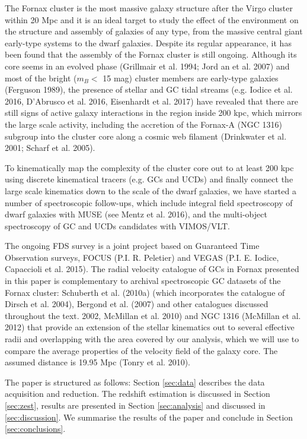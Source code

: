 The Fornax cluster is the most massive galaxy structure after the Virgo cluster 
within 20 Mpc and it is an ideal target to study the effect of the environment 
on the structure and assembly of galaxies of any type, from the massive central 
giant early-type systems to the dwarf galaxies. Despite its regular appearance, 
it has been found that the assembly of the Fornax cluster is still ongoing. 
Although its core seems in an evolved phase (Grillmair et al. 1994; Jord an et 
al. 2007) and most of the bright ($m_B < $  15 mag) cluster members are 
early-type galaxies (Ferguson 1989), the presence of stellar and GC tidal 
streams (e.g. Iodice et al. 2016, D’Abrusco et al. 2016, Eisenhardt et al. 
2017) have revealed that there are still signs of active galaxy interactions in 
the region inside 200 kpc, which mirrors the large scale activity, including 
the accretion of the Fornax-A (NGC 1316) subgroup into the cluster core along a 
cosmic web filament (Drinkwater et al. 2001; Scharf et al. 2005).

To kinematically map the complexity of the cluster core out to at least 200 kpc 
using discrete kinematical tracers (e.g. GCs and UCDs) and finally connect the 
large scale kinematics down to the scale of the dwarf galaxies, we have started 
a number of spectroscopic follow-ups, which include integral field spectroscopy 
of dwarf galaxies with MUSE (see Mentz et al. 2016), and the multi-object 
spectroscopy  of GC and UCDs candidates with VIMOS/VLT.

The ongoing FDS survey is a joint project based on Guaranteed Time Observation 
surveys, FOCUS (P.I. R. Peletier) and VEGAS (P.I. E. Iodice, Capaccioli et al. 
2015).
The radial velocity catalogue of GCs in Fornax presented in this paper is 
complementary to archival spectroscopic GC datasets of the Fornax cluster: 
Schuberth et al. (2010a) (which incorporates the catalogue of Dirsch et al. 
2004), Bergond et al. (2007) and other catalogues discussed throughout the 
text. 
2002, McMillan et al. 2010) and NGC 1316 (McMillan et al. 2012) that provide an 
extension of the stellar kinematics out to several effective radii and 
overlapping with the area covered by our analysis, which we will use to compare 
the average properties of the velocity field of the galaxy core.
The assumed distance is 19.95 Mpc (Tonry et al. 2010).  

The paper is structured as follows: Section \ref{sec:data} describes the data 
acquisition and reduction. The redshift estimation is discussed in Section 
\ref{sec:zest}, results are presented in Section \ref{sec:analysis} and 
discussed in \ref{sec:discussion}. We summarise the results of the paper and 
conclude in Section \ref{sec:conclusions}. 

